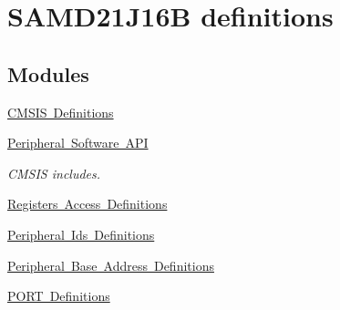 \hypertarget{group___s_a_m_d21_j16_b__definitions}{}\section{S\+A\+M\+D21\+J16B definitions}
\label{group___s_a_m_d21_j16_b__definitions}
\subsection*{Modules}
\begin{DoxyCompactItemize}
\item 
\mbox{\hyperlink{group___s_a_m_d21_j16_b__cmsis}{C\+M\+S\+I\+S Definitions}}
\item 
\mbox{\hyperlink{group___s_a_m_d21_j16_b__api}{Peripheral Software A\+PI}}
\begin{DoxyCompactList}\small\item\em C\+M\+S\+IS includes. \end{DoxyCompactList}\item 
\mbox{\hyperlink{group___s_a_m_d21_j16_b__reg}{Registers Access Definitions}}
\item 
\mbox{\hyperlink{group___s_a_m_d21_j16_b__id}{Peripheral Ids Definitions}}
\item 
\mbox{\hyperlink{group___s_a_m_d21_j16_b__base}{Peripheral Base Address Definitions}}
\item 
\mbox{\hyperlink{group___s_a_m_d21_j16_b__port}{P\+O\+R\+T Definitions}}
\end{DoxyCompactItemize}
